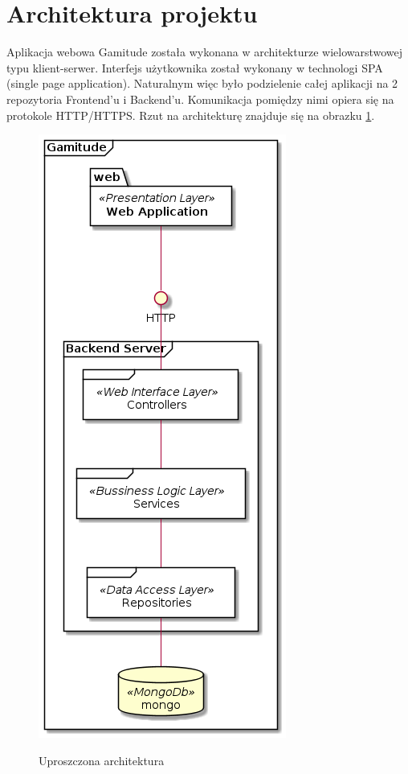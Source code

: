 \documentclass[a4paper,11pt]{report}
\begin{document}
\section {Architektura projektu}
Aplikacja webowa Gamitude została wykonana w architekturze wielowarstwowej typu klient-serwer.
Interfejs użytkownika został wykonany w technologi SPA (single page application).
Naturalnym więc było podzielenie całej aplikacji na 2 repozytoria Frontend'u i Backend'u.
Komunikacja pomiędzy nimi opiera się na protokole HTTP/HTTPS. Rzut na architekturę znajduje się na obrazku \ref{fig:overwiewarch}.\\
\begin{figure}[H]
	\centering
	\includegraphics[scale=0.4]{gamitude_overview}\\
	\caption{Uproszczona architektura}
	\label{fig:overwiewarch}
\end{figure}
\end{document}
